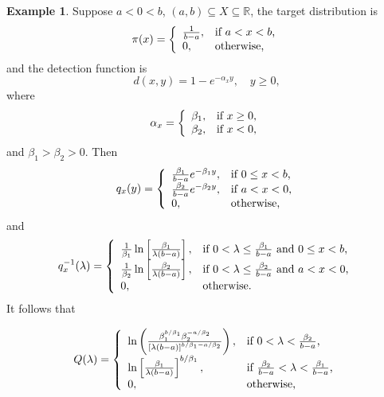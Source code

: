 \documentclass[12pt]{article}
\theoremstyle{plain}
\theoremstyle{definition}
\newtheorem{example}{Example}%
\theoremstyle{remark}
\begin{document}
\begin{example}
\label{ex:countercontinuous}
Suppose $a<0<b$, $(a, b)\subseteq X\subseteq \mathbb{R}$, the target distribution is 
\[
\pi (x)=\left\{
		                           \begin{array}{ll}
		                         \frac{1}{b-a},& \hbox{if $a<x<b$,} \\
					0,  & \hbox{otherwise,} 
		                          \end{array}
		                         \right.
\]
and the detection function is 
\[d(x, y)=1-e^{-\alpha_xy},\quad y\geq 0,\]
where 
\[
\alpha_x=\left\{
		                           \begin{array}{ll}
		                           \beta_1,& \hbox{if $x\geq 0$,} \\
					\beta_2,  & \hbox{if $x<0$,} 
		                          \end{array}
		                         \right.
\]
and $\beta_1> \beta_2>0$.  Then 
\[
q_x(y)=\left\{
		                           \begin{array}{ll}
		                          \frac{\beta_1}{b-a}e^{-\beta_1 y},& \hbox{if $0\leq x<b$,} \\
		                          \frac{\beta_2}{b-a}e^{-\beta_2 y},& \hbox{if $a<x<0$,} \\
		                          0,& \hbox{otherwise,} \\
		                          \end{array}
		                         \right.
\]
and
\[
q_x^{-1}(\lambda)=\left\{
		                           \begin{array}{ll}
		                          \frac{1}{\beta_1} \ln\left[\frac{\beta_1}{\lambda(b-a)}\right],& \hbox{if  $0<\lambda\leq \frac{\beta_1}{b-a}$ and $0\leq x<b$,} \\
		                          \frac{1}{\beta_2} \ln\left[\frac{\beta_2}{\lambda(b-a)}\right],& \hbox{if  $0<\lambda\leq \frac{\beta_2}{b-a}$ and $a<x<0$,} \\
		                          0,& \hbox{otherwise.} \\
		                          \end{array}
		                         \right.
\]
It follows that 

\begin{eqnarray*}
Q(\lambda) =\left\{
		                           \begin{array}{ll}
		                         \ln \left(\frac{\beta_1^{b/\beta_1}\beta_2^{-a/\beta_2}}{\left[\lambda (b-a)\right]^{b/\beta_1-a/\beta_2}}\right),& \hbox{if $0<\lambda<\frac{\beta_2}{b-a}$,} \\
		                          \ln\left[\frac{\beta_1}{\lambda(b-a)}\right]^{b/\beta_1},& \hbox{if $\frac{\beta_2}{b-a}<\lambda<\frac{\beta_1}{b-a}$,} \\
		                          0,& \hbox{otherwise,} \\
		                          \end{array}
		                         \right.
\end{eqnarray*}




\end{example}
\end{document}
